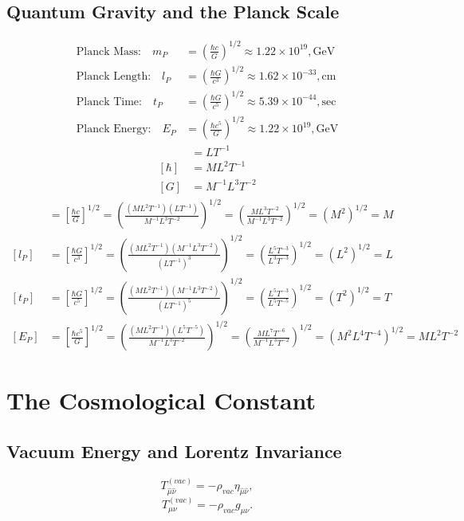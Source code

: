 \documentclass[11pt, a4paper]{report}
\begin{document}
\subsection{Quantum Gravity and the Planck Scale}
\begin{align}
\text{Planck Mass:} \quad m_{P} &= \left(\frac{\hbar c}{G}\right)^{1/2} \approx 1.22 \times 10^{19} , \text{GeV} \\
\text{Planck Length:} \quad l_{P} &= \left(\frac{\hbar G}{c^{3}}\right)^{1/2} \approx 1.62 \times 10^{-33} , \text{cm} \\
\text{Planck Time:} \quad t_{P} &= \left(\frac{\hbar G}{c^{5}}\right)^{1/2} \approx 5.39 \times 10^{-44} , \text{sec} \\
\text{Planck Energy:} \quad E_{P} &= \left(\frac{\hbar c^{5}}{G}\right)^{1/2} \approx 1.22 \times 10^{19} , \text{GeV}
\end{align}
\begin{align}
[c] &= L T^{-1} \\
[\hbar] &= M L^{2} T^{-1} \\
[G] &= M^{-1} L^{3} T^{-2}
\end{align}
\begin{align}
[m_{P}] &= \left[ \frac{\hbar c}{G} \right]^{1/2} = \left( \frac{(M L^{2} T^{-1})(L T^{-1})}{M^{-1} L^{3} T^{-2}} \right)^{1/2} = \left( \frac{M L^{3} T^{-2}}{M^{-1} L^{3} T^{-2}} \right)^{1/2} = (M^{2})^{1/2} = M \\
[l_{P}] &= \left[ \frac{\hbar G}{c^{3}} \right]^{1/2} = \left( \frac{(M L^{2} T^{-1})(M^{-1} L^{3} T^{-2})}{(L T^{-1})^{3}} \right)^{1/2} = \left( \frac{L^{5} T^{-3}}{L^{3} T^{-3}} \right)^{1/2} = (L^{2})^{1/2} = L \\
[t_{P}] &= \left[ \frac{\hbar G}{c^{5}} \right]^{1/2} = \left( \frac{(M L^{2} T^{-1})(M^{-1} L^{3} T^{-2})}{(L T^{-1})^{5}} \right)^{1/2} = \left( \frac{L^{5} T^{-3}}{L^{5} T^{-5}} \right)^{1/2} = (T^{2})^{1/2} = T \\
[E_{P}] &= \left[ \frac{\hbar c^{5}}{G} \right]^{1/2} = \left( \frac{(M L^{2} T^{-1})(L^{5} T^{-5})}{M^{-1} L^{3} T^{-2}} \right)^{1/2} = \left( \frac{M L^{7} T^{-6}}{M^{-1} L^{3} T^{-2}} \right)^{1/2} = (M^{2} L^{4} T^{-4})^{1/2} = M L^{2} T^{-2}
\end{align}

\section{The Cosmological Constant}
\subsection{Vacuum Energy and Lorentz Invariance}
\begin{equation}
\label{eq:vac_inertial}
T_{\hat{\mu}\hat{\nu}}^{(vac)} = -\rho_{vac} \eta_{\hat{\mu}\hat{\nu}},
\end{equation}
\begin{equation}
\label{eq:vac_general}
T_{\mu\nu}^{(vac)} = -\rho_{vac} g_{\mu\nu}.
\end{equation}
\end{document}
